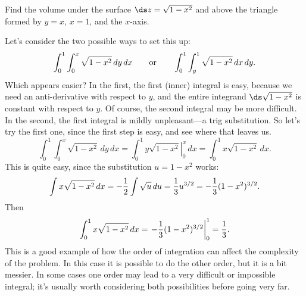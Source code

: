 \begin{example} Find the volume under the surface $\ds z=\sqrt{1-x^2}$ and above
the triangle formed by $y=x$, $x=1$, and the $x$-axis.

Let's consider the two possible ways to set this up:
$$\int_0^1 \int_0^x \sqrt{1-x^2}\,dy\,dx \qquad\hbox{or}\qquad
\int_0^1 \int_y^1 \sqrt{1-x^2}\,dx\,dy.
$$
Which appears easier? In the first, the first (inner) integral is
easy, because we need an anti-derivative with respect to $y$, and the
entire integrand $\ds\sqrt{1-x^2}$ is constant with respect to $y$. Of
course, the second integral may be more difficult. In the second, the
first integral is mildly unpleasant---a trig substitution. So let's
try the first one, since the first step is easy, and see where that
leaves us.
$$\int_0^1 \int_0^x \sqrt{1-x^2}\,dy\,dx=
\int_0^1 \left. y\sqrt{1-x^2}\right|_0^x\,dx=
\int_0^1 x\sqrt{1-x^2}\,dx.
$$
This is quite easy, since the substitution $u=1-x^2$ works:
$$\int x\sqrt{1-x^2}\,dx=-{1\over 2}\int \sqrt u\,du
={1\over3}u^{3/2}=-{1\over3}(1-x^2)^{3/2}.
$$
Then 
$$\int_0^1 x\sqrt{1-x^2}\,dx=\left. -{1\over3}(1-x^2)^{3/2}\right|_0^1
={1\over3}.
$$
This is a good example of how the order of integration can affect the
complexity of the problem. In this case it is possible to do the other
order, but it is a bit messier. In some cases one order may lead to a
very difficult or impossible integral; it's usually worth considering
both possibilities before going very far.
\end{example}

